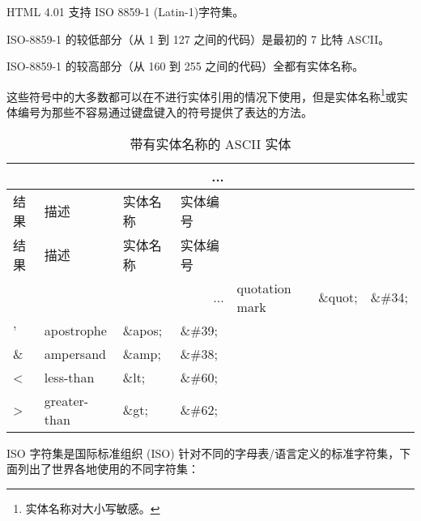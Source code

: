 HTML 4.01 支持 ISO 8859-1 (Latin-1)字符集。

\begin{compactitem}
\item ISO-8859-1 的较低部分（从 1 到 127 之间的代码）是最初的 7 比特 ASCII。
\item ISO-8859-1 的较高部分（从 160 到 255 之间的代码）全都有实体名称。
\end{compactitem}

这些符号中的大多数都可以在不进行实体引用的情况下使用，但是实体名称\footnote{实体名称对大小写敏感。}或实体编号为那些不容易通过键盘键入的符号提供了表达的方法。


\begin{longtable}{|l|l|l|l|}
\multicolumn{4}{r}{...}
\tabularnewline\hline
结果		&描述	&实体名称	&实体编号
\endhead
\caption{带有实体名称的 ASCII 实体}\\
\hline
结果		&描述	&实体名称	&实体编号
\tabularnewline\hline
\endfirsthead

\multicolumn{4}{r}{...}
\endfoot


\endlastfoot
\hline
"		&quotation mark		&\&quot;		&\&\#34;	\\
\hline
'		&apostrophe 			&\&apos;		&\&\#39;\\
\hline
\&		&ampersand			&\&amp;		&\&\#38;\\
\hline
<		&less-than			&\&lt;		&\&\#60;\\
\hline
>		&greater-than			&\&gt;		&\&\#62;\\
\hline
\end{longtable}


ISO 字符集是国际标准组织 (ISO) 针对不同的字母表/语言定义的标准字符集，下面列出了世界各地使用的不同字符集：

